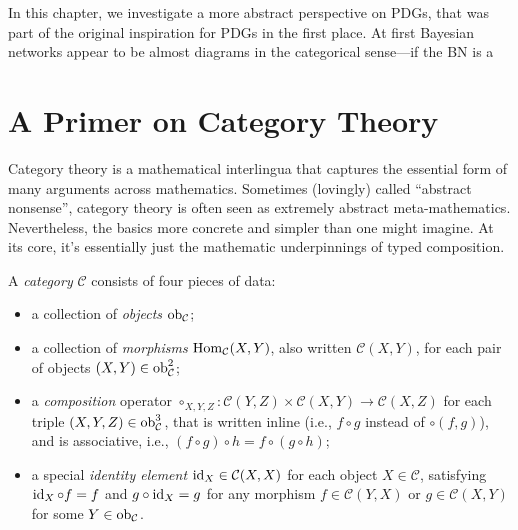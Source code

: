     \label{chap:PDG-cat}

In this chapter, we investigate a more abstract perspective on PDGs, that was part of the original inspiration for PDGs in the first place. 
At first Bayesian networks appear to be almost diagrams in the categorical sense---if the BN is a 

\section{A Primer on Category Theory}
Category theory is a mathematical interlingua that captures the essential form of many arguments across mathematics. 
Sometimes (lovingly) called ``abstract nonsense'', category theory is often seen as extremely abstract meta-mathematics.  
Nevertheless, the basics more concrete and simpler than one might imagine.
At its core, it's essentially just the mathematic underpinnings of typed composition.  

\begin{defn}[category]
    A \emph{category} $\mathcal C$ consists of four pieces of data:
    \begin{itemize}[left=0pt,topsep=0pt]
        \item a collection of \emph{objects} $\operatorname{\mathop{\mathrm{ob}}}_{\cal C}$;
        \item a collection of \emph{morphisms}
            $\operatorname{\mathop{\mathrm{Hom}}}_{\mathcal C}(X,Y)$,  also written $\mathcal C(X,Y)$, for each pair of objects $(X,Y) \in \operatorname{\mathop{\mathrm{ob}}}_{\mathcal C}^2$;
        \item a \emph{composition} operator 
        $\circ_{X,Y,Z}: \mathcal C(Y,Z) \times \mathcal C(X,Y) \to \mathcal C(X,Z)$ for each triple $(X,Y,Z) \in \operatorname{\mathop{\mathrm{ob}}}_{\cal C}^3$, that is written inline (i.e., $f \circ g$ instead of $\circ(f,g)$), and is associative, i.e., $(f \circ g) \circ h = f \circ (g \circ h)$;
        \item a special \emph{identity element} $\operatorname{\mathrm{id}}_{X} \in \mathcal C(X,X)$ for each object $X \in \mathcal C$, satisfying $\operatorname{\mathrm{id}}_X \circ f = f$ and $g \circ \operatorname{\mathrm{id}}_X = g$ for any morphism $f \in \mathcal C(Y,X)$ or $g \in \mathcal C(X,Y)$ for some $Y \in \operatorname{\mathop{\mathrm{ob}}}_{\mathcal C}$.
        \qedhere
    \end{itemize}    
\end{defn}

